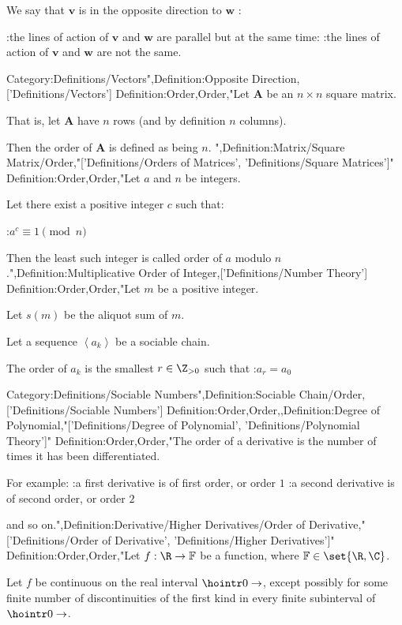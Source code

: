 We say that $\mathbf v$ is in the opposite direction to $\mathbf w$ :

:the lines of action of $\mathbf v$ and $\mathbf w$ are parallel
but at the same time:
:the lines of action of $\mathbf v$ and $\mathbf w$ are not the same.

Category:Definitions/Vectors",Definition:Opposite Direction,['Definitions/Vectors']
Definition:Order,Order,"Let $\mathbf A$ be an $n \times n$ square matrix.

That is, let $\mathbf A$ have $n$ rows (and by definition $n$ columns).


Then the order of $\mathbf A$ is defined as being $n$.
",Definition:Matrix/Square Matrix/Order,"['Definitions/Orders of Matrices', 'Definitions/Square Matrices']"
Definition:Order,Order,"Let $a$ and $n$ be integers.

Let there exist a positive integer $c$ such that:

:$a^c \equiv 1 \pmod n$


Then the least such integer is called order of $a$ modulo $n$.",Definition:Multiplicative Order of Integer,['Definitions/Number Theory']
Definition:Order,Order,"Let $m$ be a positive integer.

Let $s \left({m}\right)$ be the aliquot sum of $m$.


Let a sequence $\left\langle{a_k}\right\rangle$ be a sociable chain.

The order of $a_k$ is the smallest $r \in \Z_{>0}$ such that
:$a_r = a_0$


Category:Definitions/Sociable Numbers",Definition:Sociable Chain/Order,['Definitions/Sociable Numbers']
Definition:Order,Order,,Definition:Degree of Polynomial,"['Definitions/Degree of Polynomial', 'Definitions/Polynomial Theory']"
Definition:Order,Order,"The order of a derivative is the number of times it has been differentiated.

For example:
:a first derivative is of first order, or order $1$
:a second derivative is of second order, or order $2$

and so on.",Definition:Derivative/Higher Derivatives/Order of Derivative,"['Definitions/Order of Derivative', 'Definitions/Higher Derivatives']"
Definition:Order,Order,"Let $f: \R \to \mathbb F$ be a function, where $\mathbb F \in \set {\R, \C}$.

Let $f$ be continuous on the real interval $\hointr 0 \to$, except possibly for some finite number of discontinuities of the first kind in every finite subinterval of $\hointr 0 \to$.



